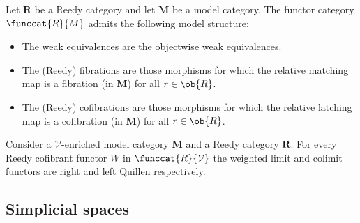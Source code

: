     \begin{property}
        Let $\mathbf{R}$ be a Reedy category and let $\mathbf{M}$ be a model category. The functor category $\funccat{R}{M}$ admits the following model structure:
        \begin{itemize}
            \item The weak equivalences are the objectwise weak equivalences.
            \item The (Reedy) fibrations are those morphisms for which the relative matching map is a fibration (in $\mathbf{M}$) for all $r\in\ob{R}$.
            \item The (Reedy) cofibrations are those morphisms for which the relative latching map is a cofibration (in $\mathbf{M}$) for all $r\in\ob{R}$.
        \end{itemize}
    \end{property}

    \begin{property}
        Consider a $\mathcal{V}$-enriched model category $\mathbf{M}$ and a Reedy category $\mathbf{R}$. For every Reedy cofibrant functor $W$ in $\funccat{R}{\mathcal{V}}$ the weighted limit and colimit functors are right and left Quillen respectively.
    \end{property}

\subsection{Simplicial spaces}

